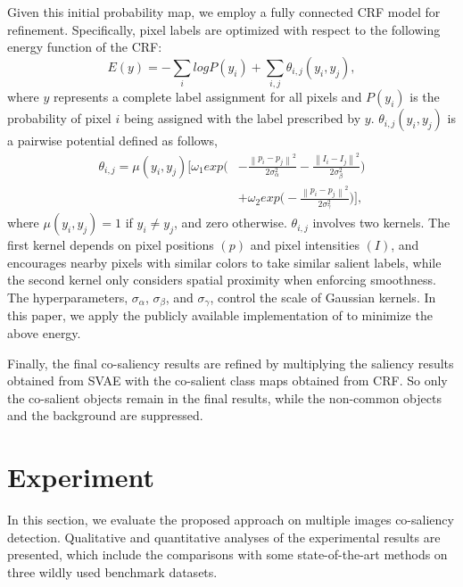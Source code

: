 \documentclass[sigconf]{acmart}
\begin{document}
Given this initial probability map, we employ a fully connected CRF model \cite{DBLP:conf/nips/KrahenbuhlK11} for refinement. Specifically, pixel labels are optimized with respect to the following energy function of the CRF:
\begin{equation}
E(y) = -\sum_{i}log P(y_{i})+\sum_{i,j}\theta_{i,j}(y_{i},y_{j}),
\end{equation}
where $y$ represents a complete label assignment for all pixels and $P(y_{i})$ is the probability of pixel $i$ being assigned with the label prescribed by $y$. $\theta_{i,j}(y_{i},y_{j})$ is a pairwise potential defined as follows,
\begin{equation}
\begin{split}
\theta_{i,j} = \mu(y_{i},y_{j})\Bigg [ \omega_{1}exp\Bigg(&-\frac{\left \| p_{i}-p_{j} \right \|^{2}}{2\sigma^{2}_{\alpha}}-\frac{\left \| I_{i}-I_{j} \right \|^{2}}{2\sigma^{2}_{\beta}}\Bigg)\\&+\omega_{2}exp\Bigg(-\frac{\left \| p_{i}-p_{j} \right \|^{2}}{2\sigma^{2}_{\gamma}}\Bigg) \Bigg ],
\end{split}
\end{equation}
where $\mu (y_{i},y_{j}) = 1$ if $y_{i} \neq y_{j}$, and zero otherwise. $\theta_{i,j}$ involves two kernels. The first kernel depends on pixel positions $(p)$ and pixel intensities $(I)$, and encourages nearby pixels with similar colors to take similar salient labels, while the second kernel only considers spatial proximity when enforcing smoothness. The hyperparameters, $\sigma_{\alpha}$, $\sigma_{\beta}$, and $\sigma_{\gamma}$, control the scale of Gaussian kernels. In this paper, we apply the publicly available implementation of \cite{DBLP:conf/nips/KrahenbuhlK11} to minimize the above energy.  

Finally, the final co-saliency results are refined by multiplying the saliency results obtained from SVAE with the co-salient class maps obtained from CRF. So only the co-salient objects remain in the final results, while the non-common objects and the background are suppressed.

\section{Experiment }
In this section, we evaluate the proposed approach on multiple images co-saliency detection. Qualitative and quantitative analyses of the experimental results are presented, which include the comparisons with some state-of-the-art methods on  three wildly used  benchmark datasets.
\end{document}
